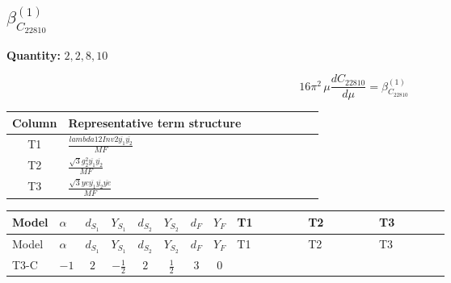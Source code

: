 \documentclass[8pt]{article}
\begin{document}
\begin{landscape}
\section*{$\beta_{C_{22810}}^{(1)}$}
\noindent\textbf{Quantity: }$\mathrm{2,2,8,10}$\par\smallskip
\[16\pi^2\,\mu\frac{d C_{22810}}{d\mu}=\beta_{C_{22810}}^{(1)}\]
\begin{center}
\begin{tabular}{@{}c >{\raggedright\arraybackslash}p{0.82\linewidth}@{}}
\toprule
Column & Representative term structure \\
\midrule
T1 & \(\displaystyle \frac{lambda12Inv2 \overline{y_{1}} \overline{y_{2}}}{MF}\) \\
\midrule
T2 & \(\displaystyle \frac{\sqrt{3} g_{2}^{2} \overline{y_{1}} \overline{y_{2}}}{MF}\) \\
\midrule
T3 & \(\displaystyle \frac{\sqrt{3} ye \overline{y_{1}} \overline{y_{2}} \overline{ye}}{MF}\) \\
\midrule
\bottomrule
\end{tabular}
\end{center}
\smallskip
\tiny
\begin{longtable}{@{}llcccccc >{\raggedright\arraybackslash}p{0.21\linewidth} >{\raggedright\arraybackslash}p{0.21\linewidth} >{\raggedright\arraybackslash}p{0.21\linewidth}@{}}
\toprule
Model & $\alpha$ & $d_{S_1}$ & $Y_{S_1}$ & $d_{S_2}$ & $Y_{S_2}$ & $d_F$ & $Y_F$ & T1 & T2 & T3 \\
\midrule
\endfirsthead
\toprule
Model & $\alpha$ & $d_{S_1}$ & $Y_{S_1}$ & $d_{S_2}$ & $Y_{S_2}$ & $d_F$ & $Y_F$ & T1 & T2 & T3 \\
\midrule
\endhead
T3-C & $-1$ & $2$ & $-\frac{1}{2}$ & $2$ & $\frac{1}{2}$ & $3$ & $0$ & \scriptsize\adjustbox{max width=\linewidth}{$\begin{gathered} - \frac{lambda12Inv2 \overline{y_{1}} \overline{y_{2}}}{3 MF}\end{gathered}$} & \scriptsize\adjustbox{max width=\linewidth}{$\begin{gathered} - \frac{\sqrt{3} g_{2}^{2} \overline{y_{1}} \overline{y_{2}}}{4 MF}\end{gathered}$} & \scriptsize\adjustbox{max width=\linewidth}{$\begin{gathered} \frac{\sqrt{3} ye \overline{y_{1}} \overline{y_{2}} \overline{ye}}{12 MF}\end{gathered}$} \\
\midrule
\bottomrule
\end{longtable}
\clearpage

\end{landscape}
\end{document}

